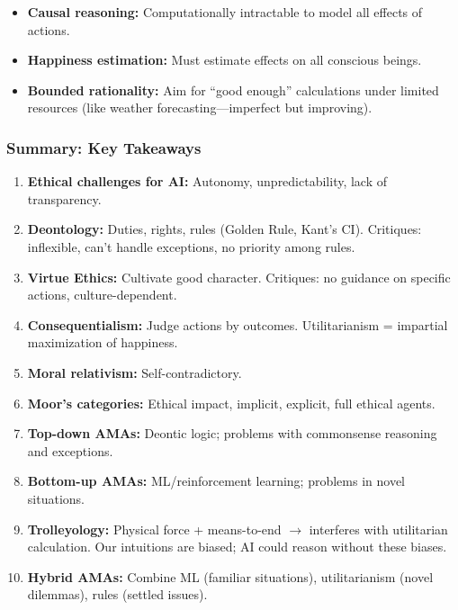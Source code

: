 \begin{tipbox}
\begin{itemize}
  \item \textbf{Causal reasoning:} Computationally intractable to model all effects of actions.
  \item \textbf{Happiness estimation:} Must estimate effects on all conscious beings.
  \item \textbf{Bounded rationality:} Aim for ``good enough'' calculations under limited resources (like weather forecasting---imperfect but improving).
\end{itemize}
\end{tipbox}

\bigseparator

\subsubsection{Summary: Key Takeaways}

\begin{keybox}
\begin{enumerate}
  \item \textbf{Ethical challenges for AI:} Autonomy, unpredictability, lack of transparency.
  \item \textbf{Deontology:} Duties, rights, rules (Golden Rule, Kant's CI). Critiques: inflexible, can't handle exceptions, no priority among rules.
  \item \textbf{Virtue Ethics:} Cultivate good character. Critiques: no guidance on specific actions, culture-dependent.
  \item \textbf{Consequentialism:} Judge actions by outcomes. Utilitarianism = impartial maximization of happiness.
  \item \textbf{Moral relativism:} Self-contradictory.
  \item \textbf{Moor's categories:} Ethical impact, implicit, explicit, full ethical agents.
  \item \textbf{Top-down AMAs:} Deontic logic; problems with commonsense reasoning and exceptions.
  \item \textbf{Bottom-up AMAs:} ML/reinforcement learning; problems in novel situations.
  \item \textbf{Trolleyology:} Physical force + means-to-end $\to$ interferes with utilitarian calculation. Our intuitions are biased; AI could reason without these biases.
  \item \textbf{Hybrid AMAs:} Combine ML (familiar situations), utilitarianism (novel dilemmas), rules (settled issues).
\end{enumerate}
\end{keybox}

